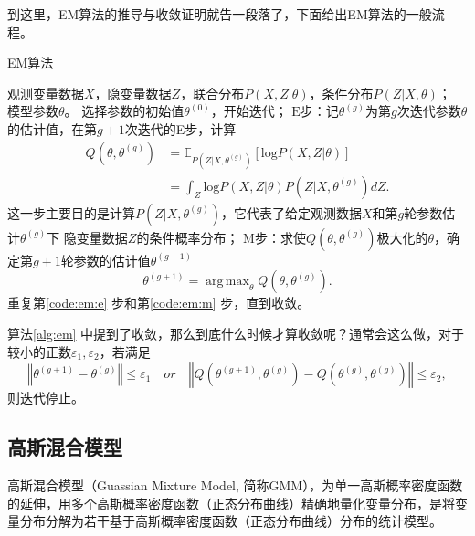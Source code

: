 \documentclass[UTF8]{ctexart}
\DeclareMathOperator*{\argmax}{arg\,max}
\begin{document}
到这里，EM算法的推导与收敛证明就告一段落了，下面给出EM算法的一般流程。

\begin{algorithm}[htb]
  \caption{EM算法}
  \label{alg:em}
  \begin{algorithmic}[1]
    \Require
    观测变量数据$X$，隐变量数据$Z$，联合分布$P(X,Z|\theta)$，条件分布$P(Z|X,\theta)$；
    \Ensure
    模型参数$\theta$。
    \State 选择参数的初始值$\theta^{(0)}$，开始迭代；
    \label{code:em:init}
    \State $\mathrm{E}$步：记$\theta^{(g)}$为第$g$次迭代参数$\theta$的估计值，在第$g+1$次迭代的E步，计算
    \begin{equation}
      \begin{split}
        Q\left(\theta, \theta^{(g)}\right) &= \mathbb{E}_{P(Z|X,\theta^{(g)})}\left[\mathrm{log}P(X,Z|\theta)\right]\\
        &= \int_{Z}\mathrm{log}P (X, Z | \theta) P \left(Z|X, \theta^{(g)} \right)dZ.
      \end{split}
    \end{equation}
    这一步主要目的是计算$P(Z|X,\theta^{(g)})$，它代表了给定观测数据$X$和第$g$轮参数估计$\theta^{(g)}$下
    隐变量数据$Z$的条件概率分布；
    \label{code:em:e}
    \State $\mathrm{M}$步：求使$Q\left(\theta, \theta^{(g)}\right)$极大化的$\theta$，确定第$g+1$轮参数的估计值$\theta^{(g+1)}$
    \begin{equation}
      \theta^{(g+1)} = \argmax_{\theta}Q\left(\theta, \theta^{(g)}\right).
    \end{equation}
    \label{code:em:m}
    \State 重复第\ref{code:em:e} 步和第\ref{code:em:m} 步，直到收敛。
    \label{code:em:loop}
  \end{algorithmic}
\end{algorithm}

算法\ref{alg:em} 中提到了收敛，那么到底什么时候才算收敛呢？通常会这么做，对于较小的正数$\varepsilon_1, \varepsilon_2$，若满足
\begin{equation}
  \left\Vert \theta^{(g+1)}-\theta^{(g)} \right\Vert \le \varepsilon_1 \quad or \quad \left\Vert Q\left(\theta^{(g+1)}, \theta^{(g)}\right) - Q\left(\theta^{(g)}, \theta^{(g)}\right) \right\Vert \le \varepsilon_2,
\end{equation}
则迭代停止。

\subsection{高斯混合模型}

高斯混合模型（Guassian Mixture Model, 简称GMM），为单一高斯概率密度函数的延伸，用多个高斯概率密度函数（正态分布曲线）精确地量化变量分布，是将变量分布分解为若干基于高斯概率密度函数（正态分布曲线）分布的统计模型。
\end{document}
